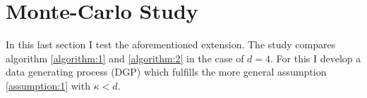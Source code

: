 \section{Monte-Carlo Study}
\label{section:monte_carlo}

In this last section I test the aforementioned extension. The study compares algorithm
\ref{algorithm:1} and \ref{algorithm:2} in the case of $d=4$. For this I develop a data
generating process (DGP) which fulfills the more general assumption \ref{assumption:1}
with $\kappa < d$.
